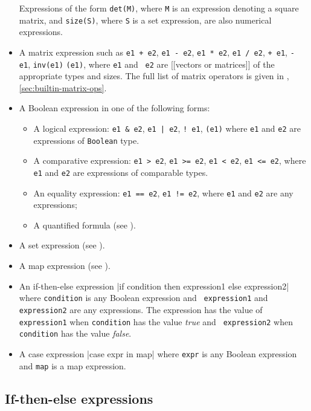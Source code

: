 \documentclass[12pt]{article}
\begin{document}
\begin{itemize}
  Expressions of the form {\tt det(M)}, where {\tt M} is an expression
  denoting a square matrix, and {\tt size(S)}, where {\tt S} is a set
  expression, are also numerical expressions.
\item A matrix expression such as \texttt{e1 + e2}, \texttt{e1 - e2},
  \texttt{e1 * e2}, \texttt{e1 / e2},  \texttt{+ e1},
  \texttt{- e1}, {\tt inv(e1)} \texttt{(e1)}, where {\tt e1} and {\tt
    e2} are [[vectors or matrices]] of the appropriate types and
  sizes. The full list of matrix
  operators is given in ,
  \ref{sec:builtin-matrix-ops}.
\item A Boolean expression in one of the following forms:
\begin{itemize}
\item A logical expression: \texttt{e1 \& e2}, \texttt{e1 | e2}, \texttt{! e1}, \texttt{(e1)} where 
\texttt{e1} and \texttt{e2} are expressions of {\tt Boolean} type.
\item A comparative expression: \texttt{e1 > e2}, \texttt{e1 >= e2}, \texttt{e1 < e2}, \texttt{e1 <= e2}, where \texttt{e1} and \texttt{e2} are expressions of comparable types.
\item An equality expression: \texttt{e1 == e2}, \texttt{e1 != e2}, where \texttt{e1} and \texttt{e2} are any expressions;
\item A quantified formula (see ).
\end{itemize}
\item A set expression (see ).
\item A map expression (see ).
\item An if-then-else expression
     \blog|if condition then expression1 else expression2|
     where {\tt condition} is any Boolean expression and {\tt
       expression1} and {\tt expression2} are any expressions.
     The expression has the value of {\tt
       expression1} when {\tt condition} has the value {\it true}
     and {\tt
       expression2} when {\tt condition} has the value {\it false}.
\item A case expression
    \blog|case expr in map|
     where {\tt expr} is any Boolean expression and {\tt map} is a map
     expression.
\end{itemize}


\subsection{If-then-else expressions}\label{if-then-else-section}
\end{document}
